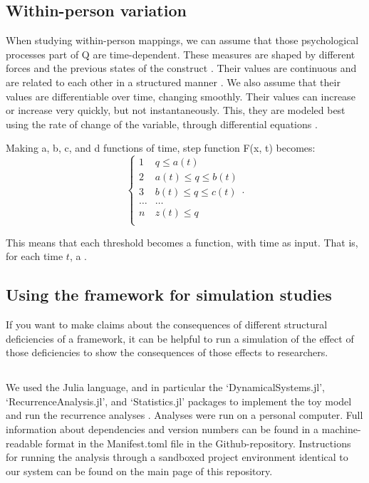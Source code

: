 \documentclass[utf8]{FrontiersinVancouver}
\begin{document}
\subsection{Within-person variation}
When studying within-person mappings, we can assume that those psychological processes part of Q are time-dependent. These measures are shaped by different forces and the previous states of the construct \citep{olthofComplexityPsychologicalSelfratings2020b}. Their values are continuous and are related to each other in a structured manner \citep{bokerConsequencesContinuityHunt2002}. We also assume that their values are differentiable over time, changing smoothly. Their values can increase or increase very quickly, but not instantaneously. This, they are modeled best using the rate of change of the variable, through differential equations \citep{molenaarNewPersonSpecificParadigm2009}.

Making a, b, c, and d functions of time, step function F(x, t) becomes: 
\[
\begin{cases} 
    1 & q \leq a(t)\\
    2 & a(t) \leq q \leq b(t)\\
    3 & b(t) \leq q \leq c(t)\\
    \ldots & \ldots\\    
    n & z(t) \leq q\\
\end{cases}.
\]

This means that each threshold becomes a function, with time as input. That is, for each time $t$, a . 


\subsection{Using the framework for simulation studies}
If you want to make claims about the consequences of different structural deficiencies of a framework, it can be helpful to run a simulation of the effect of those deficiencies to show the consequences of those effects to researchers. 


\subsection{}


We used the Julia language, and in particular the `DynamicalSystems.jl', `RecurrenceAnalysis.jl', and `Statistics.jl' packages to implement the toy model and run the recurrence analyses \citep{bezanson2017julia, Datseris2018, DatserisParlitz2022}. Analyses were run on a personal computer. Full information about dependencies and version numbers can be found in a machine-readable format in the Manifest.toml file in the Github-repository. Instructions for running the analysis through a sandboxed project environment identical to our system can be found on the main page of this repository.
\end{document}
